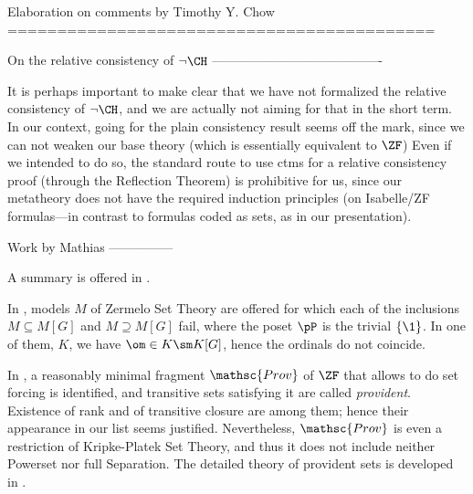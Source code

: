 Elaboration on comments by Timothy Y. Chow
===========================================

On the relative consistency of $\neg\CH$
----------------------------------------

It is perhaps important to make clear that we have not formalized the
relative consistency of $\neg\CH$, and we are
actually not aiming for that in the short term. In our context, going
for the plain consistency result seems off the mark, since we
can not weaken our base theory (which is essentially equivalent to $\ZF$)%
Even if we intended to do so, the standard route to use ctms for a
relative consistency proof (through the Reflection Theorem) is
prohibitive for us, since our metatheory does not have the required
induction principles (on Isabelle/ZF formulas---in contrast to
formulas coded as sets, as in our presentation).


Work by Mathias
---------------

A summary is offered in \cite[Sect.~6]{kanamori-mathias}.


In \cite[Sect.~1]{mathias:hal-01188043}, models $M$ of Zermelo Set
Theory are offered for which each of the inclusions $M\subseteq M[G]$ and
$M\supseteq M[G]$ fail, where the poset $\pP$ is the trivial
$\{\1 \}$. In one of them, $K$, we have $\om\in K \sm K[G]$, hence the
ordinals do not coincide.


In \cite{mathias-provident}, a reasonably minimal fragment
$\mathsc{Prov}$ of $\ZF$ that allows to do set forcing is identified,
and transitive sets satisfying it are called
\emph{provident}. Existence of rank and of transitive closure are
among them; hence their appearance in our list seems
justified. Nevertheless, $\mathsc{Prov}$ is even a restriction of
Kripke-Platek Set Theory, and thus it does not include neither
Powerset nor full Separation. The detailed theory of provident sets is
developed in \cite{mathias-bowler-gentle}. %



